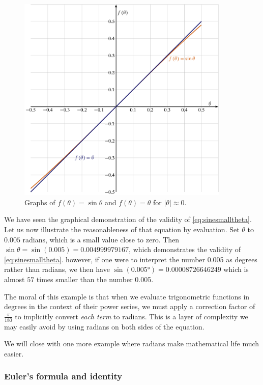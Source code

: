 \documentclass[
  a4paper,
]{article}
\begin{document}
\begin{figure}
\hypertarget{fig:xsinx}{%
\centering
\includegraphics[width=0.9\textwidth,height=\textheight]{images/xsinx.png}
\caption{Graphs of \(f(\theta)= \sin\theta\) and \(f(\theta) = \theta\)
for \(\lvert\theta\rvert\approx 0\).}\label{fig:xsinx}
}
\end{figure}

We have seen the graphical demonstration of the validity of
\cref{eq:sinesmalltheta}. Let us now illustrate the reasonableness of
that equation by evaluation. Set \(\theta\) to \(0.005\) radians, which
is a small value close to zero. Then
\(\sin\theta = \sin(0.005) = 0.004999979167\), which demonstrates the
validity of \cref{eq:sinesmalltheta}. however, if one were to interpret
the number 0.005 as degrees rather than radians, we then have
\(\sin(0.005°) = 0.00008726646249\) which is almost \(57\) times smaller
than the number 0.005.

The moral of this example is that when we evaluate trigonometric
functions in degrees in the context of their power series, we must apply
a correction factor of \(\frac{\pi}{180}\) to implicitly convert
\emph{each term} to radians. This is a layer of complexity we may easily
avoid by using radians on both sides of the equation.

We will close with one more example where radians make mathematical life
much easier.

\hypertarget{eulers-formula-and-identity}{%
\subsubsection{Euler's formula and
identity}\label{eulers-formula-and-identity}}
\end{document}

